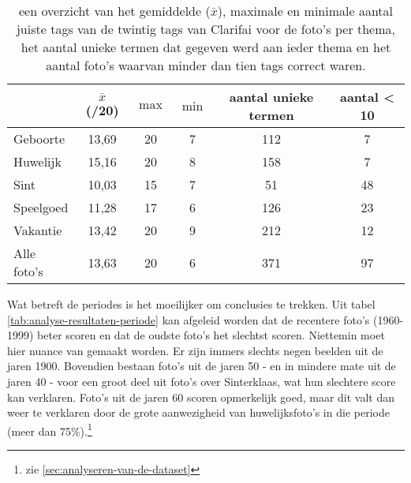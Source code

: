 \begin{table}
    \renewcommand\arraystretch{1.2}
    \centering
	\begin{tabular}{p{3cm}|ccccc}
	 	\toprule
		 & $\bar{x}$ (/20) & $\max$ & $\min$ & aantal unieke termen & aantal < 10 \\ 
		\midrule
		Geboorte & 13,69 & 20 & 7 & 112 & 7 \\ 
		Huwelijk & 15,16 & 20 & 8 & 158 & 7 \\ 
		Sint & 10,03 & 15 & 7 & 51 & 48 \\ 
		Speelgoed & 11,28 & 17 & 6 & 126 & 23 \\ 
		Vakantie & 13,42 & 20 & 9 & 212 & 12 \\ 
		Alle foto's & 13,63 & 20 & 6 & 371 & 97 \\ 
	\bottomrule
	\end{tabular} 
	\caption[een overzicht van de resultaten per thema na gebruikt van het ingebouwde model van Clarifai]{een overzicht van het gemiddelde ($\bar{x}$), maximale en minimale aantal juiste tags van de twintig tags van Clarifai voor de foto’s per thema, het aantal unieke termen dat gegeven werd aan ieder thema en het aantal foto’s waarvan minder dan tien tags correct waren. }
	\label{tab:analyse-resultaten-thema}
\end{table}

Wat betreft de periodes is het moeilijker om conclusies te trekken. Uit tabel \ref{tab:analyse-resultaten-periode} kan afgeleid worden dat de recentere foto’s (1960-1999) beter scoren en dat de oudste foto’s het slechtst scoren. Niettemin moet hier nuance van gemaakt worden. Er zijn immers slechts negen beelden uit de jaren 1900. Bovendien bestaan foto’s uit de jaren 50 - en in mindere mate uit de jaren 40 - voor een groot deel uit foto’s over Sinterklaas, wat hun slechtere score kan verklaren. Foto’s uit de jaren 60 scoren opmerkelijk goed, maar dit valt dan weer te verklaren door de grote aanwezigheid van huwelijksfoto’s in die periode (meer dan 75\%).\footnote{zie \ref{sec:analyseren-van-de-dataset}}

